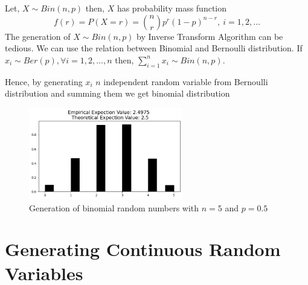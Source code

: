 \begin{example}
   Let, $X\sim Bin(n,p)$ then,  $X$ has probability mass function
   \[
       f(r) = P(X=r) = {n\choose r}p^{r}(1-p)^{n-r},\  i = 1,2, \ldots 
   \] 
   The generation of $X\sim Bin(n,p)$ by Inverse Transform Algorithm can be tedious. We can use the relation between Binomial and Bernoulli distribution.
   If $x_i \sim Ber(p), \forall i = 1,2, \ldots, n$ then, $\sum_{i=1}^{n} x_i\sim Bin(n,p)$.

   Hence, by generating $x_i$ $n$ independent random variable from Bernoulli distribution and summing them we get binomial distribution
   \begin{figure}[H]
       \centering
       \includegraphics[width=0.6\textwidth]{images/bin_ITA.png}
       \caption{Generation of  binomial random numbers with $n=5$ and  $p=0.5$}
   \end{figure}
\end{example}

\section{Generating Continuous Random Variables}

